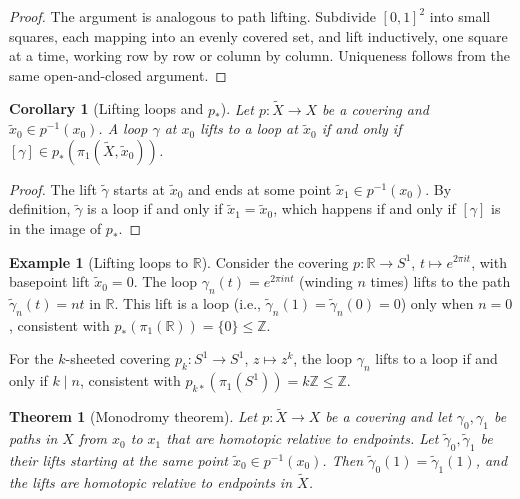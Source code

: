 \documentclass[12pt,a4paper,openany]{book}
\theoremstyle{definition}
\newtheorem{example}[definition]{Example}
\theoremstyle{plain}
\newtheorem{theorem}[definition]{Theorem}
\newtheorem{corollary}[definition]{Corollary}
\theoremstyle{remark}
\newcommand{\Z}{\mathbb{Z}}
\newcommand{\R}{\mathbb{R}}
\begin{document}
\begin{proof}
  The argument is analogous to path lifting.  Subdivide $[0,1]^2$ into small
  squares, each mapping into an evenly covered set, and lift inductively, one
  square at a time, working row by row or column by column.  Uniqueness follows
  from the same open-and-closed argument.
\end{proof}

\begin{corollary}[Lifting loops and $p_*$]\label{cor:lifting-loops}
  Let $p\colon \widetilde{X} \to X$ be a covering and
  $\tilde{x}_0 \in p^{-1}(x_0)$.  A loop $\gamma$ at $x_0$ lifts to a
  loop at $\tilde{x}_0$ if and only if
  $[\gamma] \in p_*(\pi_1(\widetilde{X}, \tilde{x}_0))$.
\end{corollary}

\begin{proof}
  The lift $\tilde{\gamma}$ starts at $\tilde{x}_0$ and ends at some point
  $\tilde{x}_1 \in p^{-1}(x_0)$.  By definition, $\tilde{\gamma}$ is a loop
  if and only if $\tilde{x}_1 = \tilde{x}_0$, which happens if and only if
  $[\gamma]$ is in the image of $p_*$.
\end{proof}

\begin{example}[Lifting loops to $\R$]\label{ex:lifting-loops-R}
  Consider the covering $p\colon \R \to S^1$, $t \mapsto e^{2\pi i t}$, with
  basepoint lift $\tilde{x}_0 = 0$.  The loop $\gamma_n(t) = e^{2\pi i n t}$
  (winding $n$ times) lifts to the path $\tilde{\gamma}_n(t) = nt$ in $\R$.
  This lift is a loop (i.e., $\tilde{\gamma}_n(1) = \tilde{\gamma}_n(0) = 0$)
  only when $n = 0$, consistent with $p_*(\pi_1(\R)) = \{0\} \leq \Z$.

  For the $k$-sheeted covering $p_k\colon S^1 \to S^1$, $z \mapsto z^k$,
  the loop $\gamma_n$ lifts to a loop if and only if $k \mid n$, consistent
  with $p_{k*}(\pi_1(S^1)) = k\Z \leq \Z$.
\end{example}

\begin{theorem}[Monodromy theorem]\label{thm:monodromy-thm}
  Let $p\colon \widetilde{X} \to X$ be a covering and let $\gamma_0, \gamma_1$
  be paths in $X$ from $x_0$ to $x_1$ that are homotopic relative to
  endpoints.  Let $\tilde{\gamma}_0, \tilde{\gamma}_1$ be their lifts starting
  at the same point $\tilde{x}_0 \in p^{-1}(x_0)$.  Then
  $\tilde{\gamma}_0(1) = \tilde{\gamma}_1(1)$, and the lifts are homotopic
  relative to endpoints in $\widetilde{X}$.
\end{theorem}
\end{document}
